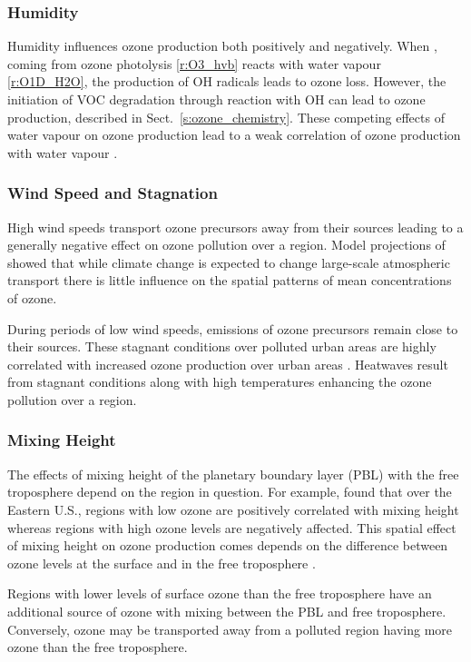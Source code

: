 \subsubsection{Humidity}
Humidity influences ozone production both positively and negatively.
When , coming from ozone photolysis \eqref{r:O3_hvb} reacts with water vapour \eqref{r:O1D_H2O}, the production of OH radicals leads to ozone loss.
However, the initiation of VOC degradation through reaction with OH can lead to ozone production, described in Sect.~\ref{s:ozone_chemistry}.
These competing effects of water vapour on ozone production lead to a weak correlation of ozone production with water vapour \citep{Jacob:2009}.

\subsubsection{Wind Speed and Stagnation}
High wind speeds transport ozone precursors away from their sources leading to a generally negative effect on ozone pollution over a region.
Model projections of \citet{Doherty:2013} showed that while climate change is expected to change large-scale atmospheric transport there is little influence on the spatial patterns of mean concentrations of ozone.

During periods of low wind speeds, emissions of ozone precursors remain close to their sources.
These stagnant conditions over polluted urban areas are highly correlated with increased ozone production over urban areas \citep{Jacob:2009}.
Heatwaves result from stagnant conditions along with high temperatures enhancing the ozone pollution over a region.

\subsubsection{Mixing Height}
The effects of mixing height of the planetary boundary layer (PBL) with the free troposphere depend on the region in question.
For example, \citet{Dawson:2007} found that over the Eastern U.S., regions with low ozone are positively correlated with mixing height whereas regions with high ozone levels are negatively affected.
This spatial effect of mixing height on ozone production comes depends on the difference between ozone levels at the surface and in the free troposphere \citep{Jacob:2009}.

Regions with lower levels of surface ozone than the free troposphere have an additional source of ozone with mixing between the PBL and free troposphere.
Conversely, ozone may be transported away from a polluted region having more ozone than the free troposphere.

